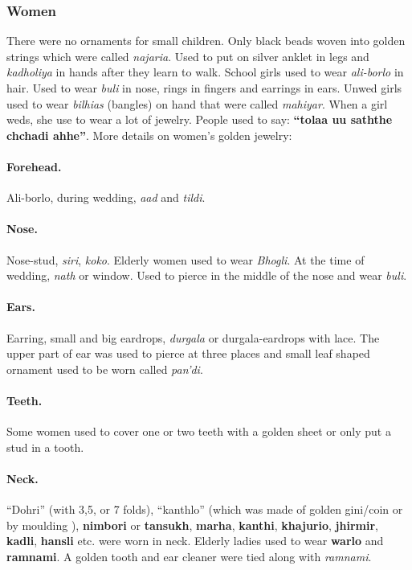 \subsubsection*{Women} There were no ornaments for small children. Only black beads
woven into golden strings which were called \textit{najaria}. Used to put on
silver anklet in legs and \textit{kadholiya} in hands after they learn to walk.
School girls used to wear \textit{ali-borlo} in hair. Used to wear \textit{buli}
in nose, rings in fingers and earrings in ears. Unwed girls used to wear
\textit{bilhias} (bangles) on hand that were called \textit{mahiyar}. When a
girl weds, she use to wear a lot of jewelry. People used to say: \textbf{``tolaa
uu saththe chchadi ahhe''}. More details on women's golden jewelry:

\paragraph{Forehead.} Ali-borlo, during wedding, \textit{aad} and \textit{tildi}.

\paragraph{Nose.} Nose-stud, \textit{siri}, \textit{koko}. Elderly women used
to wear \textit{Bhogli}. At the time of wedding, \textit{nath} or window. Used
to pierce in the middle of the nose and wear \textit{buli}.

\paragraph{Ears.} Earring, small and big eardrops, \textit{durgala} or
durgala-eardrops with lace. The upper part of ear was used to pierce at three
places and small leaf shaped ornament used to be worn called \textit{pan'di}.

\paragraph{Teeth.} Some women used to cover one or two teeth with a golden
sheet or only put a stud in a tooth.

\paragraph{Neck.} ``Dohri'' (with 3,5, or 7 folds), ``kanthlo'' (which was
made of golden gini/coin or by moulding ), \textbf{nimbori} or
\textbf{tansukh}, \textbf{marha}, \textbf{kanthi}, \textbf{khajurio},
\textbf{jhirmir}, \textbf{kadli}, \textbf{hansli} etc. were worn in neck.
Elderly ladies used to wear \textbf{warlo} and \textbf{ramnami}. A golden
tooth and ear cleaner were tied along with \textit{ramnami}.

